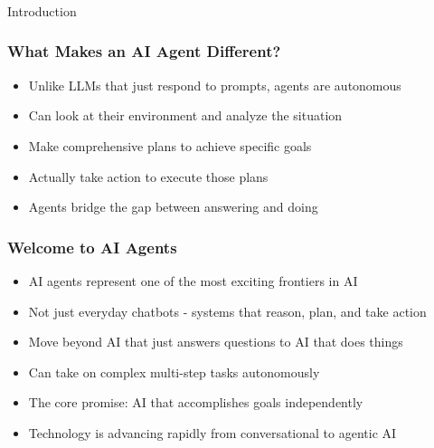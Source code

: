 \begin{frame}[fragile]\frametitle{}
\begin{center}
{\Large Introduction}
\end{center}
\end{frame}

\begin{frame}[fragile]\frametitle{What Makes an AI Agent Different?}
      \begin{itemize}
        \item Unlike LLMs that just respond to prompts, agents are autonomous
        \item Can look at their environment and analyze the situation
        \item Make comprehensive plans to achieve specific goals
        \item Actually take action to execute those plans
        \item Agents bridge the gap between answering and doing
      \end{itemize}
\end{frame}

\begin{frame}[fragile]\frametitle{Welcome to AI Agents}
      \begin{itemize}
        \item AI agents represent one of the most exciting frontiers in AI
        \item Not just everyday chatbots - systems that reason, plan, and take action
        \item Move beyond AI that just answers questions to AI that does things
        \item Can take on complex multi-step tasks autonomously
        \item The core promise: AI that accomplishes goals independently
        \item Technology is advancing rapidly from conversational to agentic AI
      \end{itemize}
\end{frame}


